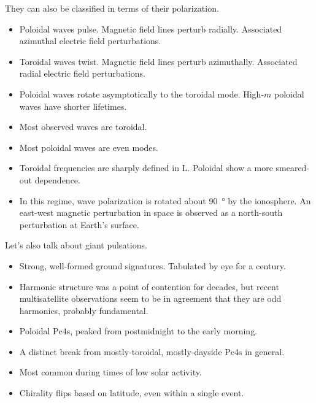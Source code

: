\documentclass{article}
\newcommand{\azm}{\ensuremath{m}\xspace}
\begin{document}
They can also be classified in terms of their polarization.

\begin{itemize}
    \item Poloidal waves pulse. Magnetic field lines perturb radially. Associated azimuthal electric field perturbations.
    \item Toroidal waves twist. Magnetic field lines perturb azimuthally. Associated radial electric field perturbations.
    \item Poloidal waves rotate asymptotically to the toroidal mode. High-\azm poloidal waves have shorter lifetimes\cite{mann_1995,mann_1997,radoski_1974}.
    \item Most observed waves are toroidal\cite{anderson_1990}.
    \item Most poloidal waves are even modes\cite{hughes_1978,singer_1982,takahashi_1990}.
    \item Toroidal frequencies are sharply defined in L. Poloidal show a more smeared-out dependence. \cite{engebretson_1986}
    \item In this regime, wave polarization is rotated about \SI{90}{\degree} by the ionosphere\cite{nishida_1964_screening}. An east-west magnetic perturbation in space is observed as a north-south perturbation at Earth's surface.
\end{itemize}

Let's also talk about giant pulsations.

\begin{itemize}
    \item Strong, well-formed ground signatures. Tabulated by eye for a century\cite{birkeland_1901}.
    \item Harmonic structure was a point of contention for decades, but recent multisatellite observations seem to be in agreement that they are odd harmonics, probably fundamental\cite{glassmeier_1999,hillebrand_1982,kokubun_1989,takahashi_2011}.
    \item Poloidal Pc4s, peaked from postmidnight to the early morning\cite{chisham_1991,glassmeier_1980,rostoker_1979}.
    \item A distinct break from mostly-toroidal, mostly-dayside Pc4s in general.
    \item Most common during times of low solar activity\cite{brekke_1987}.
    \item Chirality flips based on latitude, even within a single event\cite{eleman_1967}.
\end{itemize}
\end{document}
